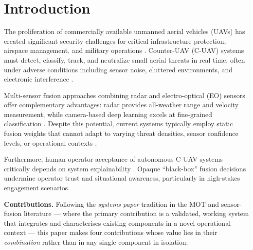 \documentclass[drones,article,submit,pdftex]{Definitions/mdpi}
\begin{document}
\section{Introduction}
\label{sec:intro}

The proliferation of commercially available unmanned aerial vehicles (UAVs) has
created significant security challenges for critical infrastructure protection,
airspace management, and military operations
\cite{ref_uav_threat_survey,ref_cuav_review}.
Counter-UAV (C-UAV) systems must detect, classify, track, and neutralize
small aerial threats in real time, often under adverse conditions including
sensor noise, cluttered environments, and electronic interference
\cite{ref_drone_detection_dl,ref_small_uav_detection}.

Multi-sensor fusion approaches combining radar and electro-optical (EO)
sensors offer complementary advantages: radar provides all-weather range and
velocity measurement, while camera-based deep learning excels at fine-grained
classification \cite{ref_radar_camera_fusion,ref_multisensor_cuav}.
Despite this potential, current systems typically employ static fusion weights
that cannot adapt to varying threat densities, sensor confidence levels, or
operational contexts \cite{ref_fixed_fusion_limit}.

Furthermore, human operator acceptance of autonomous C-UAV systems critically
depends on system explainability \cite{ref_xai_defense,ref_xai_uav}.
Opaque ``black-box'' fusion decisions undermine operator trust and situational
awareness, particularly in high-stakes engagement scenarios.

\noindent\textbf{Contributions.}
Following the \emph{systems paper} tradition in the MOT and sensor-fusion
literature --- where the primary contribution is a validated, working system that
integrates and characterises existing components in a novel operational context
\cite{ref_sort,ref_deepsort,ref_bytetrack} --- this paper makes four
contributions whose value lies in their \emph{combination} rather than in any
single component in isolation:
\end{document}
